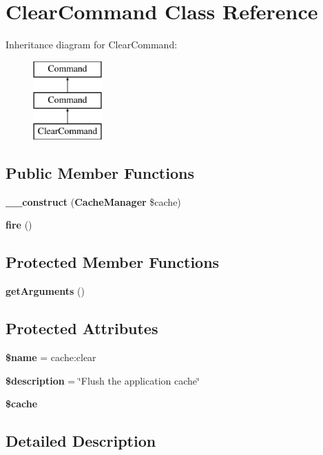 \section{Clear\+Command Class Reference}
\label{class_illuminate_1_1_cache_1_1_console_1_1_clear_command}
Inheritance diagram for Clear\+Command\+:\begin{figure}[H]
\begin{center}
\leavevmode
\includegraphics[height=3.000000cm]{class_illuminate_1_1_cache_1_1_console_1_1_clear_command}
\end{center}
\end{figure}
\subsection*{Public Member Functions}
\begin{DoxyCompactItemize}
\item 
{\bf \+\_\+\+\_\+construct} ({\bf Cache\+Manager} \$cache)
\item 
{\bf fire} ()
\end{DoxyCompactItemize}
\subsection*{Protected Member Functions}
\begin{DoxyCompactItemize}
\item 
{\bf get\+Arguments} ()
\end{DoxyCompactItemize}
\subsection*{Protected Attributes}
\begin{DoxyCompactItemize}
\item 
{\bf \$name} = \textquotesingle{}cache\+:clear\textquotesingle{}
\item 
{\bf \$description} = \char`\"{}Flush the application cache\char`\"{}
\item 
{\bf \$cache}
\end{DoxyCompactItemize}


\subsection{Detailed Description}


